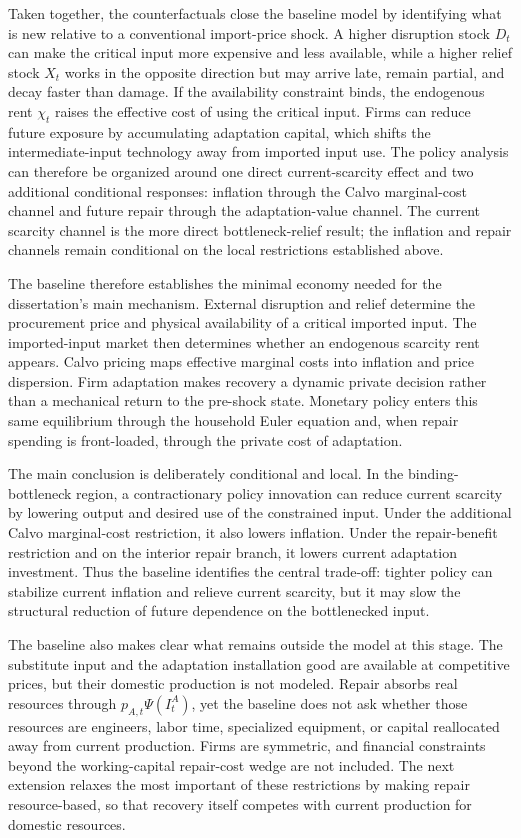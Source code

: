﻿\documentclass[12pt]{article}
\theoremstyle{remark}
\begin{document}
Taken together, the counterfactuals close the baseline model by identifying what is new relative to
a conventional import-price shock. A higher disruption stock $D_t$ can make the critical input more
expensive and less available, while a higher relief stock $X_t$ works in the opposite direction but
may arrive late, remain partial, and decay faster than damage. If the availability constraint
binds, the endogenous rent $\chi_t$ raises the effective cost of using the critical input. Firms
can reduce future exposure by accumulating adaptation capital, which shifts the intermediate-input
technology away from imported input use. The policy analysis can therefore be organized around one
direct current-scarcity effect and two additional conditional responses: inflation through the
Calvo marginal-cost channel and future repair through the adaptation-value channel. The current
scarcity channel is the more direct bottleneck-relief result; the inflation and repair channels
remain conditional on the local restrictions established above.

The baseline therefore establishes the minimal economy needed for the dissertation's main
mechanism. External disruption and relief determine the procurement price and physical availability
of a critical imported input. The imported-input market then determines whether an endogenous
scarcity rent appears. Calvo pricing maps effective marginal costs into inflation and price
dispersion. Firm adaptation makes recovery a dynamic private decision rather than a mechanical
return to the pre-shock state. Monetary policy enters this same equilibrium through the household
Euler equation and, when repair spending is front-loaded, through the private cost of adaptation.

The main conclusion is deliberately conditional and local. In the binding-bottleneck region, a
contractionary policy innovation can reduce current scarcity by lowering output and desired use of
the constrained input. Under the additional Calvo marginal-cost restriction, it also lowers
inflation. Under the repair-benefit restriction and on the interior repair branch, it lowers current
adaptation investment. Thus the baseline identifies the central trade-off: tighter policy can
stabilize current inflation and relieve current scarcity, but it may slow the structural reduction
of future dependence on the bottlenecked input.

The baseline also makes clear what remains outside the model at this stage. The substitute input and
the adaptation installation good are available at competitive prices, but their domestic production
is not modeled. Repair absorbs real resources through $p_{A,t}\Psi(I_t^A)$, yet the baseline does
not ask whether those resources are engineers, labor time, specialized equipment, or capital
reallocated away from current production. Firms are symmetric, and financial constraints beyond the
working-capital repair-cost wedge are not included. The next extension relaxes the most important of
these restrictions by making repair resource-based, so that recovery itself competes with current
production for domestic resources.
\end{document}
